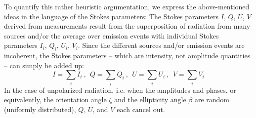 To quantify this rather heuristic argumentation, we express the
above-mentioned ideas in the language of the Stokes parameters: The
Stokes parameters $I$, $Q$, $U$, $V$ derived from measurements result
from the superposition of radiation from many sources and/or the
average over emission events with individual Stokes parameters $I_i$,
$Q_i$, $U_i$, $V_i$.  Since the different sources and/or emission events are
incoherent, the Stokes parameters -- which are intensity, not
amplitude quantities -- can simply be added up:
\begin{equation}
  \label{eq:polarization:summed_stokes}
  I = \sum_i I_i \: \mbox{, }\; 
  Q = \sum_i Q_i \: \mbox{, }\; 
  U = \sum_i U_i \: \mbox{, }\; 
  V = \sum_i V_i
\end{equation}
In the case of unpolarized radiation, i.e. when the amplitudes and
phases, or equivalently, the orientation angle $\zeta$ and the
ellipticity angle $\beta$ are random (uniformly distributed), 
$Q$, $U$, and $V$
each cancel out.

